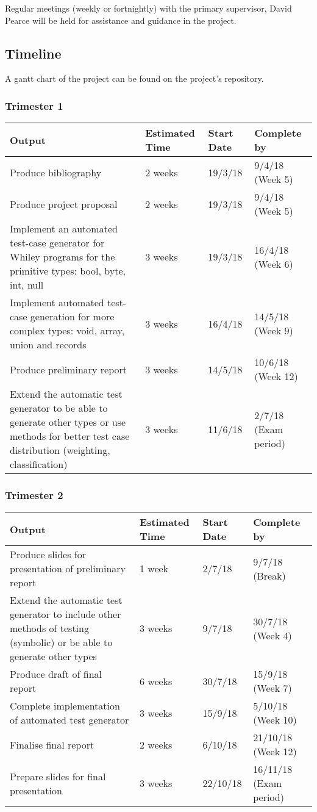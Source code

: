 \documentclass[11pt, a4paper, twoside, openright]{report}
\begin{document}
Regular meetings (weekly or fortnightly) with the primary supervisor, David Pearce will be held for assistance and guidance in the project.

\subsection*{Timeline}
A gantt chart of the project can be found on the project's repository.
\subsubsection*{Trimester 1}
\begin{tabular}{ |p{10cm}|p{2cm}|p{2cm}|p{2cm}| }
	\hline
	\textbf{Output} & \textbf{Estimated Time} &
	\textbf{Start Date} & \textbf{Complete by}\\
	\hline
	Produce bibliography & 2 weeks & 19/3/18
	& 9/4/18 (Week 5) \\
	\hline
	Produce project proposal & 2 weeks & 19/3/18 & 9/4/18 (Week 5) \\
	\hline
	Implement an automated test-case generator for Whiley programs for the primitive types: bool, byte, int, null & 3 weeks & 19/3/18 & 16/4/18 (Week 6) \\
	
	\hline
	Implement automated test-case generation for more complex types: void, array, union and records & 3 weeks & 16/4/18 & 14/5/18 (Week 9) \\
	\hline
	Produce preliminary report & 3 weeks & 14/5/18 & 10/6/18 (Week 12) \\	
	\hline
	Extend the automatic test generator to be able to generate other types or use methods for better test case distribution (weighting, classification) & 3 weeks & 11/6/18 & 2/7/18 (Exam period) \\
	\hline
\end{tabular}

\subsubsection*{Trimester 2}
\begin{tabular}{ |p{10cm}|p{2cm}|p{2cm}|p{2cm}| }
	\hline
	\textbf{Output} & \textbf{Estimated Time} & \textbf{Start Date} & \textbf{Complete by}\\
	\hline
	Produce slides for presentation of preliminary report & 1 week & 2/7/18 & 9/7/18 (Break)\\
	\hline
	Extend the automatic test generator to include other methods of testing (symbolic) or be able to generate other types & 3 weeks & 9/7/18 & 30/7/18 (Week 4)\\
	\hline
	Produce draft of final report & 6 weeks & 30/7/18 & 15/9/18 (Week 7)\\
	\hline
	Complete implementation of automated test generator & 3 weeks & 15/9/18 & 5/10/18 (Week 10) \\
	\hline
	Finalise final report & 2 weeks & 6/10/18 & 21/10/18 (Week 12) \\
	\hline
	Prepare slides for final presentation & 3 weeks & 22/10/18 & 16/11/18 (Exam period)\\
	\hline
\end{tabular}
\end{document}
